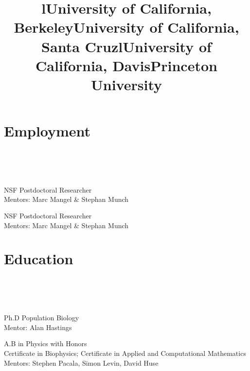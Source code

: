 \documentclass[margin]{res}
\begin{document}
\begin{resume}

\section{Employment}
\begin{format}
\title{l}\\\\
\body\\
\end{format}

\title{\textbf{University of California, Berkeley}}
\begin{position}
NSF Postdoctoral Researcher \\
Mentors: Marc Mangel \& Stephan Munch 
\end{position}

\title{\textbf{University of California, Santa Cruz}}
\begin{position}
NSF Postdoctoral Researcher \\
Mentors: Marc Mangel \& Stephan Munch 
\end{position}

\section{Education}
\begin{format}
\title{l}\\\\
\body\\
\end{format}

\title{\textbf{University of California, Davis}}
\begin{position}
Ph.D Population Biology \\
Mentor: Alan Hastings
\end{position}

\title{\textbf{Princeton University}}
\begin{position}
A.B  in Physics with Honors \\ 
Certificate in Biophysics; Certificate in Applied and Computational Mathematics\\
Mentors: Stephen Pacala, Simon Levin, David Huse
\end{position}


\end{resume}
\end{document}
